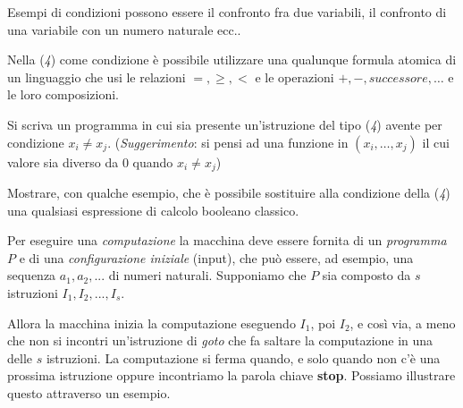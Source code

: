 Esempi di condizioni possono essere il confronto fra due variabili, il confronto di
una variabile con un numero naturale ecc..

\begin{nota}
Nella (\emph{4}) come condizione \`e possibile utilizzare 
una qualunque formula atomica di un linguaggio che usi le relazioni
$=,\geq,<$ e le operazioni $+,-,successore,\ldots $ e le loro
composizioni.
\end{nota}



\begin{extra}
Si scriva un programma in cui sia presente un'istruzione del tipo
(\emph{4}) avente per condizione $x_i\neq x_j$. (\emph{Suggerimento}:
si pensi ad una funzione in $(x_i,\ldots ,x_j)$ il cui valore sia
diverso da $0$ quando $x_i\neq x_j$)
\end{extra}	

\begin{extra}
Mostrare, con qualche esempio, che \`e possibile sostituire alla
condizione della (\emph{4}) una qualsiasi espressione di
calcolo \newline booleano classico.
\end{extra}	

Per eseguire una \emph{computazione} la macchina deve essere
fornita di un \emph{programma} $P$ e di una \emph{configurazione
  iniziale} (input), che pu\`o essere, ad esempio, una sequenza $a_1, a_2,
...$ di numeri naturali.
Supponiamo che $P$ sia composto da $s$ istruzioni $I_1, I_2,...,
I_s$.

Allora la macchina inizia la computazione eseguendo $I_1$, poi $I_2$,
e cos\`i via, a meno che non si incontri un'istruzione di \emph{goto}
che fa saltare la computazione in una delle $s$ istruzioni. La
computazione si ferma quando, e solo quando non c'\`e una prossima
istruzione oppure incontriamo la parola chiave \textbf{stop}.
Possiamo illustrare questo attraverso un esempio.
	
